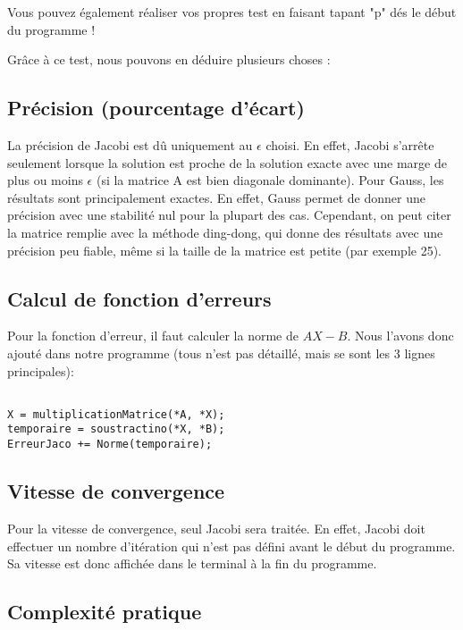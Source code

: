 \documentclass[letter]{article}
\begin{document}
Vous pouvez également réaliser vos propres test en faisant tapant "p" dés le début du programme !

Grâce à ce test, nous pouvons en déduire plusieurs choses :


\subsection{Précision (pourcentage d'écart)}
\label{sec:orgb099977}
La précision de Jacobi est dû uniquement au \(\epsilon\) choisi. En effet, Jacobi s'arrête seulement lorsque la solution est proche de la solution exacte avec une marge de plus ou moins \(\epsilon\) (si la matrice A est bien diagonale dominante).
Pour Gauss, les résultats sont principalement exactes. En effet, Gauss permet de donner une précision avec une stabilité nul pour la plupart des cas.
Cependant, on peut citer la matrice remplie avec la méthode ding-dong, qui donne des résultats avec une précision peu fiable, même si la taille de la matrice est petite (par exemple 25). 


\subsection{Calcul de fonction d'erreurs}
\label{sec:org5d25491}

Pour la fonction d'erreur, il faut calculer la norme de \(AX - B\). Nous l'avons donc ajouté dans notre programme (tous n'est pas détaillé, mais se sont les 3 lignes principales):

\begin{verbatim}

X = multiplicationMatrice(*A, *X);
temporaire = soustractino(*X, *B);
ErreurJaco += Norme(temporaire);

\end{verbatim}

\subsection{Vitesse de convergence}
\label{sec:org1d0e6be}

Pour la vitesse de convergence, seul Jacobi sera traitée. En effet, Jacobi doit effectuer un nombre d'itération qui n'est pas défini avant le début du programme. Sa vitesse est donc affichée dans le terminal à la fin du programme.


\subsection{Complexité pratique}
\label{sec:orgddc74f6}
\end{document}
